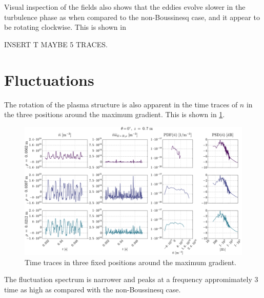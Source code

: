 Visual inspection of the fields also shows that the eddies evolve slower in the turbulence phase as when compared to the non-Boussinesq case, and it appear to be rotating clockwise.
This is shown in

INSERT T MAYBE 5 TRACES.

\section{Fluctuations}
%
The rotation of the plasma structure is also apparent in the time traces of $n$ in the three positions around the maximum gradient.
This is shown in \cref{fig:comb008B}.
%
\begin{figure}[htb]
    \centering
    \includegraphics[width=1.0\textwidth]{fig/results/compareBouss/comb008B}
    \caption{Time traces in three fixed positions around the maximum gradient.}
    \label{fig:comb008B}
\end{figure}
%
The fluctuation spectrum is narrower and peaks at a frequency appromimately $3$ time as high as compared with the non-Boussinesq case.

